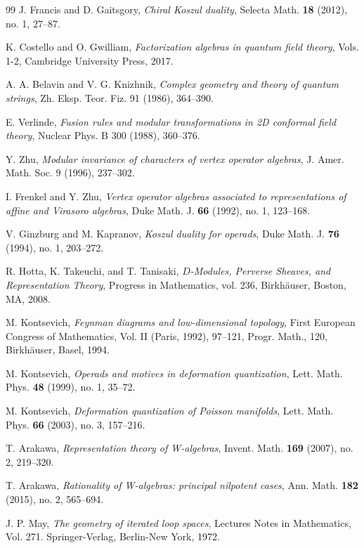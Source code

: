 \begin{thebibliography}{99}
 J. Francis and D. Gaitsgory, \emph{Chiral Koszul duality}, Selecta Math. \textbf{18} (2012), no. 1, 27--87.

 K. Costello and O. Gwilliam, \emph{Factorization algebras in quantum field theory}, Vols. 1-2, Cambridge University Press, 2017.

 A. A. Belavin and V. G. Knizhnik, \emph{Complex geometry and theory of quantum strings}, 
  Zh. Eksp. Teor. Fiz. 91 (1986), 364--390.
  
 E. Verlinde, \emph{Fusion rules and modular transformations in 2D conformal field theory}, 
  Nuclear Phys. B 300 (1988), 360--376.

 Y. Zhu, \emph{Modular invariance of characters of vertex operator algebras},
  J. Amer. Math. Soc. 9 (1996), 237--302.

 I. Frenkel and Y. Zhu, \emph{Vertex operator algebras associated to representations of affine and Virasoro algebras}, Duke Math. J. \textbf{66} (1992), no. 1, 123--168.

 V. Ginzburg and M. Kapranov, \emph{Koszul duality for operads}, Duke Math. J. \textbf{76} (1994), no. 1, 203--272.

 R. Hotta, K. Takeuchi, and T. Tanisaki, \emph{$D$-Modules, Perverse Sheaves, and Representation Theory}, Progress in Mathematics, vol. 236, Birkhäuser, Boston, MA, 2008.

 M. Kontsevich, \emph{Feynman diagrams and low-dimensional topology}, First European Congress of Mathematics, Vol. II (Paris, 1992), 97--121, Progr. Math., 120, Birkhäuser, Basel, 1994.

 M. Kontsevich, \emph{Operads and motives in deformation quantization}, Lett. Math. Phys. \textbf{48} (1999), no. 1, 35--72.

 M. Kontsevich, \emph{Deformation quantization of Poisson manifolds}, Lett. Math. Phys. \textbf{66} (2003), no. 3, 157--216.

 T. Arakawa, \emph{Representation theory of W-algebras}, Invent. Math. \textbf{169} (2007), no. 2, 219--320.

 T. Arakawa, \emph{Rationality of W-algebras: principal nilpotent cases}, Ann. Math. \textbf{182} (2015), no. 2, 565--694.

 J. P. May, \emph{The geometry of iterated loop spaces}, Lectures Notes in Mathematics, Vol. 271. Springer-Verlag, Berlin-New York, 1972.


\end{thebibliography}
